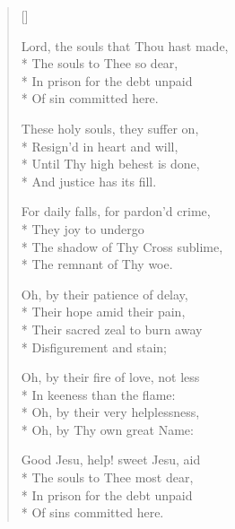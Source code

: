\newHymn
{}
\settowidth{\versewidth}{These holy souls, they suffer on}
\begin{verse}[\versewidth]

\begin{altverse}
 Lord, the souls that Thou hast made,\\*
 The souls to Thee so dear,\\*
 In prison for the debt unpaid\\*
Of sin committed here.
\end{altverse}

\begin{altverse}
These holy souls, they suffer on,\\*
Resign'd in heart and will,\\*
Until Thy high behest is done,\\*
And justice has its fill. 
\end{altverse}

\begin{altverse}
For daily falls, for pardon'd crime,\\*
They joy to undergo\\*
The shadow of Thy Cross sublime,\\*
The remnant of Thy woe.
\end{altverse}

\begin{altverse}
 Oh, by their patience of delay,\\*
Their hope amid their pain,\\*
Their sacred zeal to burn away\\*
Disfigurement and stain;
\end{altverse}

\begin{altverse}
 Oh, by their fire of love, not less\\*
In keeness than the flame:\\*
Oh, by their very helplessness,\\*
Oh, by Thy own great Name: 
\end{altverse}

\begin{altverse}
 Good Jesu, help! sweet Jesu, aid\\*
The souls to Thee most dear,\\*
In prison for the debt unpaid\\*
Of sins committed here.
\end{altverse}

\end{verse}

